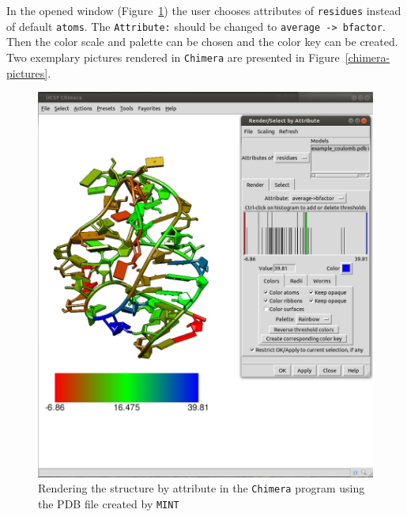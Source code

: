 \documentclass[12pt]{article}
\begin{document}
\newpage
In the opened window (Figure~\ref{chimera22}) the user chooses attributes of {\tt residues} instead of default {\tt atoms}. The {\tt Attribute:} should be changed to {\tt average -> bfactor}. Then the color scale and palette can be chosen and the color key can be created. Two exemplary pictures rendered in {\tt Chimera} are presented in Figure~\ref{chimera-pictures}.
\begin{figure}[!h]
\centering
\includegraphics[scale=0.22]{./pictures/chimera2.png}
\caption{Rendering the structure by attribute in the {\tt Chimera} program using the PDB file created by {\tt MINT}}
\label{chimera22}
\end{figure}
\end{document}
